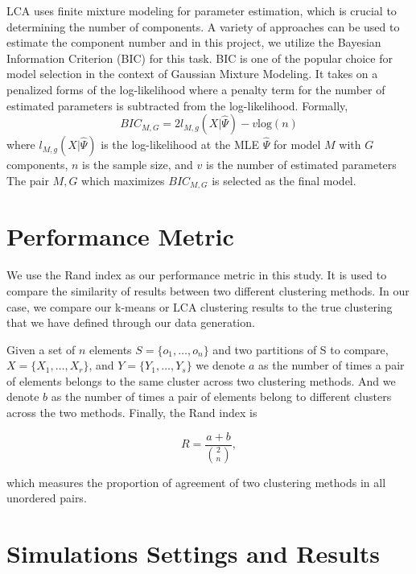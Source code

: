 \documentclass[
]{article}
\begin{document}
LCA uses finite mixture modeling for parameter estimation, which is
crucial to determining the number of components. A variety of approaches
can be used to estimate the component number and in this project, we
utilize the Bayesian Information Criterion (BIC) for this task. BIC is
one of the popular choice for model selection in the context of Gaussian
Mixture Modeling. It takes on a penalized forms of the log-likelihood
where a penalty term for the number of estimated parameters is
subtracted from the log-likelihood. Formally,
\[BIC_{M,G} = 2l_{M,g}(X|\hat{\Psi}) - v\text{log}(n)\] where
\(l_{M,g}(X|\hat{\Psi})\) is the log-likelihood at the MLE
\(\hat{\Psi}\) for model \(M\) with \(G\) components, \(n\) is the
sample size, and \(v\) is the number of estimated parameters The pair
\({M, G}\) which maximizes \(BIC_{M,G}\) is selected as the final model.

\hypertarget{performance-metric}{%
\section{Performance Metric}\label{performance-metric}}

We use the Rand index as our performance metric in this study. It is
used to compare the similarity of results between two different
clustering methods. In our case, we compare our k-means or LCA
clustering results to the true clustering that we have defined through
our data generation.

Given a set of \(n\) elements \(S = \{o_1, \dots, o_n\}\) and two
partitions of S to compare, \(X = \{X_1, \dots, X_r\}\), and
\(Y = \{Y_1, \dots, Y_s\}\) we denote \(a\) as the number of times a
pair of elements belongs to the same cluster across two clustering
methods. And we denote \(b\) as the number of times a pair of elements
belong to different clusters across the two methods. Finally, the Rand
index is

\begin{equation*}
R = \frac{a+b}{{2 \choose n}},
\end{equation*}

which measures the proportion of agreement of two clustering methods in
all unordered pairs.

\hypertarget{simulations-settings-and-results}{%
\section{Simulations Settings and
Results}\label{simulations-settings-and-results}}
\end{document}
